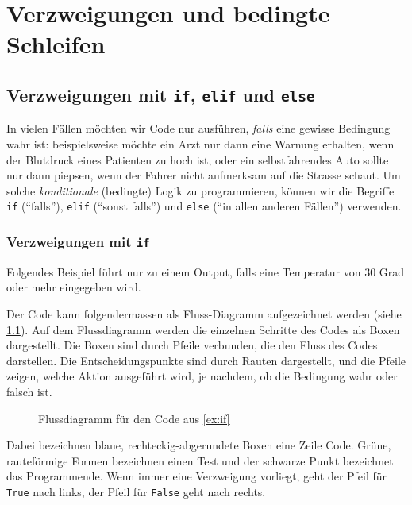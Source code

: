 
\chapter{Verzweigungen und bedingte Schleifen}\label{ch:K05_Logical_Expressions}

\section{Verzweigungen mit \texorpdfstring{\lstinline|if|}{if}, \texorpdfstring{\lstinline|elif|}{elif} und \texorpdfstring{\lstinline|else|}{else}}
In vielen Fällen möchten wir Code nur ausführen, \textit{falls} eine gewisse Bedingung wahr ist: beispielsweise möchte ein Arzt nur dann eine Warnung erhalten, wenn der Blutdruck eines Patienten zu hoch ist, oder ein selbstfahrendes Auto sollte nur dann piepsen, wenn der Fahrer nicht aufmerksam auf die Strasse schaut. Um solche \textit{konditionale} (bedingte) Logik zu programmieren, können wir die Begriffe \lstinline|if| (\enquote{falls}), \lstinline|elif| (\enquote{sonst falls}) und \lstinline|else| (\enquote{in allen anderen Fällen}) verwenden.

\subsection{Verzweigungen mit \texorpdfstring{\lstinline|if|}{if}}

\begin{myexample}\label{ex:if}
Folgendes Beispiel führt nur zu einem Output, falls eine Temperatur von 30 Grad oder mehr eingegeben wird.


Der Code kann folgendermassen als Fluss-Diagramm aufgezeichnet werden (siehe \cref{fig:if-flussdiagramm}).
Auf dem Flussdiagramm werden die einzelnen Schritte des Codes als Boxen dargestellt. Die Boxen sind durch Pfeile verbunden, die den Fluss des Codes darstellen. Die Entscheidungspunkte sind durch Rauten dargestellt, und die Pfeile zeigen, welche Aktion ausgeführt wird, je nachdem, ob die Bedingung wahr oder falsch ist.

\begin{figure}[H]
	\centering
	
	\caption{Flussdiagramm für den Code aus \cref{ex:if}}
	\label{fig:if-flussdiagramm}
\end{figure}
Dabei bezeichnen blaue, rechteckig-abgerundete Boxen eine Zeile Code. Grüne, rauteförmige Formen bezeichnen einen Test und der schwarze Punkt bezeichnet das Programmende. Wenn immer eine Verzweigung vorliegt, geht der Pfeil für \lstinline|True| nach links, der Pfeil für \lstinline|False| geht nach rechts.
\end{myexample}

